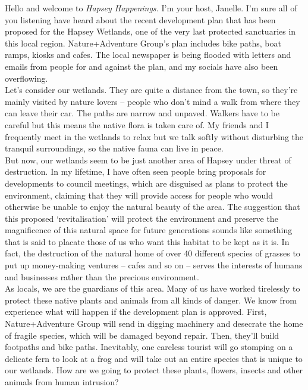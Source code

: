 \documentclass[a4paper]{article}
\begin{document}
\medskip

Hello and welcome to \textit{Hapsey Happenings.} I’m your host, Janelle. I’m sure all of you listening have heard about the recent development plan that has been proposed for the Hapsey Wetlands, one of the very last protected sanctuaries in this local region. Nature+Adventure Group’s plan includes bike paths, boat ramps, kiosks and cafes. The local newspaper is being flooded with letters and emails from people for and against the plan, and my socials have also been overflowing.\\

Let’s consider our wetlands. They are quite a distance from the town, so they’re mainly visited by nature lovers – people who don’t mind a walk from where they can leave their car. The paths are narrow and unpaved. Walkers have to be careful but this means the native flora is taken care of. My friends and I frequently meet in the wetlands to relax but we talk softly without disturbing the tranquil surroundings, so the native fauna can live in peace.\\

But now, our wetlands seem to be just another area of Hapsey under threat of destruction. In my lifetime, I have often seen people bring proposals for developments to council meetings, which are disguised as plans to protect the environment, claiming that they will provide access for people who would otherwise be unable to enjoy the natural beauty of the area. The suggestion that this proposed ‘revitalisation’ will protect the environment and preserve the magnificence of this natural space for future generations sounds like something that is said to placate those of us who want this habitat to be kept as it is. In fact, the destruction of the natural home of over 40 different species of grasses to put up money-making ventures – cafes and so on – serves the interests of humans and businesses rather than the precious environment.\\

As locals, we are the guardians of this area. Many of us have worked tirelessly to protect these native plants and animals from all kinds of danger. We know from experience what will happen if the development plan is approved. First, Nature+Adventure Group will send in digging machinery and desecrate the home of fragile species, which will be damaged beyond repair. Then, they’ll build footpaths and bike paths. Inevitably, one careless tourist will go stomping on a delicate fern to look at a frog and will take out an entire species that is unique to our wetlands. How are we going to protect these plants, flowers, insects and other animals from human intrusion?\\
\end{document}
